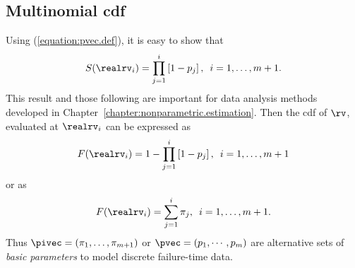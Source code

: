 \subsection{Multinomial cdf}
Using (\ref{equation:pvec.def}), it is easy to show that
\begin{equation}
\label{equation:discrete.survival.function}
S(\realrv_{i})=\prod_{j=1}^{i}\left [ 1 - p_{j} \right ],
\,\,\,i=1,\ldots,m+1.
\end{equation}
This result and those following are important for data analysis methods
developed in Chapter~\ref{chapter:nonparametric.estimation}.
Then the cdf of $\rv$, evaluated at 
$\realrv_{i}$ can be expressed as
\begin{displaymath}
F(\realrv_{i})= 1 - \prod_{j=1}^{i}\left [ 1 - p_{j} \right ],
\,\,\,i=1,\ldots,m+1
\end{displaymath}
or as
\begin{equation}
\label{equation:f.is.sum.of.pi}
F(\realrv_{i})= \sum_{j=1}^{i} \pi_{j},
\,\,\,i=1,\ldots,m+1.
\end{equation}
Thus $\pivec=(\pi_{1}, \ldots, \pi_{m+1})$ or 
$\pvec=(p_{1}, \cdots, p_{m})$ are alternative sets of {\em basic
parameters} to model discrete failure-time data.

